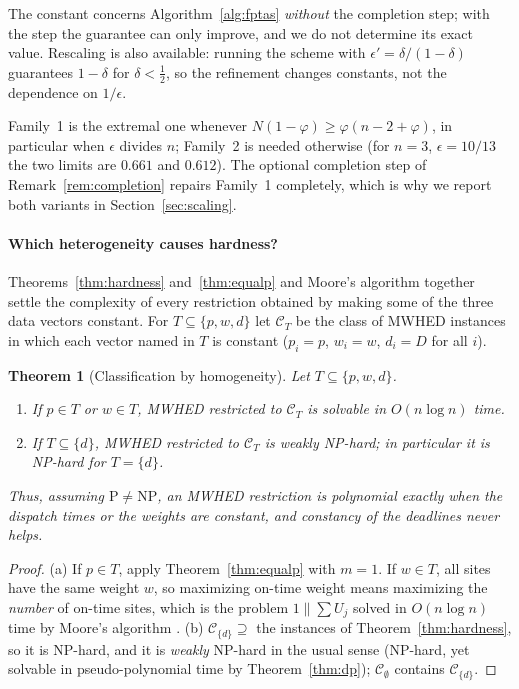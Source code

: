 \documentclass[pdflatex,sn-mathphys-ay]{sn-jnl}
\theoremstyle{thmstyleone}
\newtheorem{theorem}{Theorem}
\theoremstyle{thmstyletwo}
\theoremstyle{thmstylethree}
\begin{document}
The constant concerns Algorithm~\ref{alg:fptas} \emph{without} the
completion step; with the step the guarantee can only improve, and we do
not determine its exact value. Rescaling is also available: running the
scheme with $\epsilon'=\delta/(1-\delta)$ guarantees $1-\delta$ for
$\delta<\tfrac12$, so the refinement changes constants, not the
dependence on $1/\epsilon$.

Family~1 is the extremal one whenever $N(1-\varphi)\ge\varphi(n-2+\varphi)$, in particular
when $\epsilon$ divides $n$; Family~2 is needed otherwise (for $n=3$,
$\epsilon=10/13$ the two limits are $0.661$ and $0.612$). The optional
completion step of Remark~\ref{rem:completion} repairs Family~1
completely, which is why we report both variants in
Section~\ref{sec:scaling}.

\paragraph{Which heterogeneity causes hardness?} Theorems~\ref{thm:hardness}
and~\ref{thm:equalp} and Moore's algorithm together settle the
complexity of every restriction obtained by making some of the three
data vectors constant. For $T\subseteq\{p,w,d\}$ let $\mathcal C_T$ be
the class of MWHED instances in which each vector named in $T$ is
constant ($p_i=p$, $w_i=w$, $d_i=D$ for all $i$).

\begin{theorem}[Classification by homogeneity]\label{thm:classification}
Let $T\subseteq\{p,w,d\}$.
\begin{enumerate}
\item[(a)] If $p\in T$ or $w\in T$, MWHED restricted to $\mathcal C_T$
is solvable in $O(n\log n)$ time.
\item[(b)] If $T\subseteq\{d\}$, MWHED restricted to $\mathcal C_T$ is
weakly NP-hard; in particular it is NP-hard for $T=\{d\}$.
\end{enumerate}
Thus, assuming $\mathrm P\ne\mathrm{NP}$, an MWHED restriction is
polynomial exactly when the dispatch times or the weights are constant,
and constancy of the deadlines never helps.
\end{theorem}

\begin{proof}
(a) If $p\in T$, apply Theorem~\ref{thm:equalp} with $m=1$. If $w\in T$,
all sites have the same weight $w$, so maximizing on-time weight means
maximizing the \emph{number} of on-time sites, which is the problem
$1\|\sum U_j$ solved in $O(n\log n)$ time by Moore's algorithm
\citep{moore1968}. (b) $\mathcal C_{\{d\}}\supseteq$ the instances of
Theorem~\ref{thm:hardness}, so it is NP-hard, and it is \emph{weakly}
NP-hard in the usual sense (NP-hard, yet solvable in pseudo-polynomial
time by Theorem~\ref{thm:dp}); $\mathcal C_\emptyset$ contains
$\mathcal C_{\{d\}}$.
\end{proof}
\end{document}
